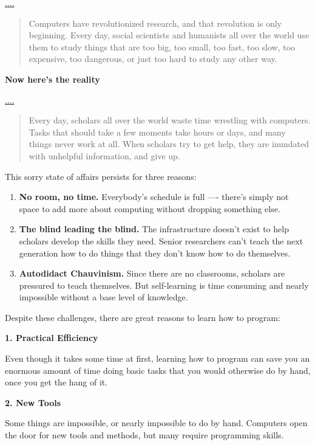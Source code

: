 \documentclass[]{book}
\begin{document}
\url{....}

\begin{quote}
Computers have revolutionized research, and that revolution is only
beginning. Every day, social scientists and humanists all over the world
use them to study things that are too big, too small, too fast, too
slow, too expensive, too dangerous, or just too hard to study any other
way.
\end{quote}

\textbf{Now here's the reality}

\url{....}

\begin{quote}
Every day, scholars all over the world waste time wrestling with
computers. Tasks that should take a few moments take hours or days, and
many things never work at all. When scholars try to get help, they are
inundated with unhelpful information, and give up.
\end{quote}

This sorry state of affairs persists for three reasons:

\begin{enumerate}
\def\labelenumi{\arabic{enumi}.}
\item
  \textbf{No room, no time.} Everybody's schedule is full ---- there's
  simply not space to add more about computing without dropping
  something else.
\item
  \textbf{The blind leading the blind.} The infrastructure doesn't exist
  to help scholars develop the skills they need. Senior researchers
  can't teach the next generation how to do things that they don't know
  how to do themselves.
\item
  \textbf{Autodidact Chauvinism.} Since there are no classrooms,
  scholars are pressured to teach themselves. But self-learning is time
  consuming and nearly impossible without a base level of knowledge.
\end{enumerate}

Despite these challenges, there are great reasons to learn how to
program:

\textbf{1. Practical Efficiency}

Even though it takes some time at first, learning how to program can
save you an enormous amount of time doing basic tasks that you would
otherwise do by hand, once you get the hang of it.

\textbf{2. New Tools}

Some things are impossible, or nearly impossible to do by hand.
Computers open the door for new tools and methods, but many require
programming skills.
\end{document}
